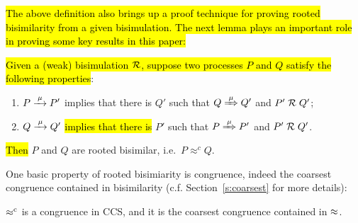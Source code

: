 \hl{The above definition also brings up a proof technique for proving rooted
bisimilarity from a given bisimulation. The next
lemma plays an
important role in proving some key results in this paper:}
\begin{lemma}
\label{l:obsCongrByWeakBisim}
\hl{Given a (weak) bisimulation $\mathrel{\cal R}$, suppose two processes $P$ and $Q$
satisfy the following properties}:
\begin{enumerate}
\item $P \arr\mu P'$ implies that there is $Q'$ such that $Q
   \Arr\mu Q'$ and $P' \mathrel{\cal R} Q'$;
\item $Q \arr\mu Q'$ \hl{implies that there is} $P'$ such that $P
   \Arr\mu P'$ and $P' \mathrel{\cal R} Q'$.
\end{enumerate}
\hl{Then} $P$ and $Q$ are rooted bisimilar, i.e.~$P \approx^c Q$.
\end{lemma}

One basic property of rooted bisimiarity is congruence,
indeed the coarsest congruence contained in bisimilarity
(c.f. Section~\ref{s:coarsest} for more details):
\begin{theorem}
\label{t:rapproxCongruence}
$\mathrel{\approx^{\rm{c}}}$ is a congruence in CCS, and it is the
coarsest congruence contained in $\approx$.
\end{theorem}

